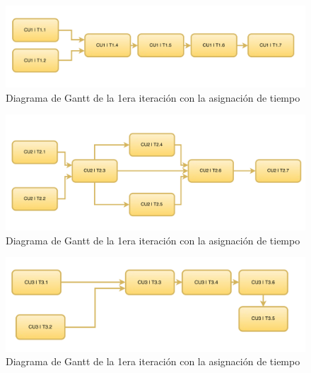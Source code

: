 \documentclass[a4paper, 10pt, twoside]{article}
\begin{document}
\begin{center}
  \begin{figure}[h!]
    \includegraphics[width=15cm]{diagramas/diag-dependecias1.png}
    \caption{Diagrama de Gantt de la 1era iteración con la asignación de tiempo}
    \label{fig:diag-dependecias1}
  \end{figure}
\end{center}

\begin{center}
  \begin{figure}[h!]
    \includegraphics[width=15cm]{diagramas/diag-dependecias2.png}
    \caption{Diagrama de Gantt de la 1era iteración con la asignación de tiempo}
    \label{fig:diag-dependecias2}
  \end{figure}
\end{center}

\begin{center}
  \begin{figure}[h!]
    \includegraphics[width=15cm]{diagramas/diag-dependecias3.png}
    \caption{Diagrama de Gantt de la 1era iteración con la asignación de tiempo}
    \label{fig:diag-dependecias3}
  \end{figure}
\end{center}
\end{document}
